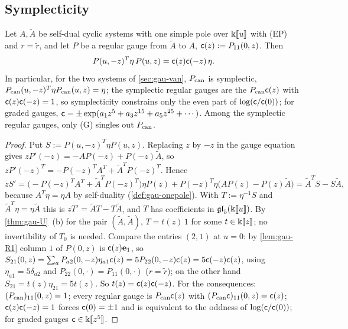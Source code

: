 \subsection{Symplecticity}
\label{sec:gau-symp}

\begin{prop}[Symplecticity]
\label{prop:gau-symp}
Let $A,\tilde A$ be self-dual cyclic systems with one simple pole over $\Bbbk[\![ u ]\!]$ with (EP) and $r=\tilde r$, and let $P$ be a regular gauge from $\tilde A$ to $A$, $\mathsf{c}(z):=P_{11}(0,z)$. Then
\begin{equation}
\label{eq:gau-symp}
P(u,-z)^T\eta\,P(u,z)=\mathsf{c}(z)\mathsf{c}(-z)\,\eta .
\end{equation}
In particular, for the two systems of \cref{sec:gau-van}, $P_{\mathrm{can}}$ is symplectic, $P_{\mathrm{can}}(u,-z)^T\eta P_{\mathrm{can}}(u,z)=\eta$; the symplectic regular gauges are the $P_{\mathrm{can}}\mathsf{c}(z)$ with $\mathsf{c}(z)\mathsf{c}(-z)=1$, so symplecticity constrains only the even part of $\log(\mathsf{c}/\mathsf{c}(0))$; for graded gauges, $\mathsf{c}=\pm\exp(a_1z^5+a_3z^{15}+a_5z^{25}+\cdots)$. Among the symplectic regular gauges, only (G) singles out $P_{\mathrm{can}}$.
\end{prop}

\begin{proof}
Put $S:=P(u,-z)^T\eta P(u,z)$. Replacing $z$ by $-z$ in the gauge equation gives $zP'(-z)=-AP(-z)+P(-z)\tilde A$, so $zP'(-z)^T=-P(-z)^TA^T+\tilde A^TP(-z)^T$. Hence
\[
zS'=\bigl(-P(-z)^TA^T+\tilde A^TP(-z)^T\bigr)\eta P(z)+P(-z)^T\eta\bigl(AP(z)-P(z)\tilde A\bigr)=\tilde A^TS-S\tilde A,
\]
because $A^T\eta=\eta A$ by self-duality (\cref{def:gau-onepole}). With $T:=\eta^{-1}S$ and $\tilde A^T\eta=\eta\tilde A$ this is $zT'=\tilde AT-T\tilde A$, and $T$ has coefficients in $\mathfrak{gl}_5(\Bbbk[\![ u ]\!])$. By \cref{thm:gau-U}~(b) for the pair $(\tilde A,\tilde A)$, $T=t(z)\,1$ for some $t\in\Bbbk[\![ z ]\!]$; no invertibility of $T_0$ is needed. Compare the entries $(2,1)$ at $u=0$: by \cref{lem:gau-R1} column $1$ of $P(0,z)$ is $\mathsf{c}(z)\mathbf e_1$, so $S_{21}(0,z)=\sum_aP_{a2}(0,-z)\eta_{a1}\mathsf{c}(z)=5P_{22}(0,-z)\mathsf{c}(z)=5\mathsf{c}(-z)\mathsf{c}(z)$, using $\eta_{a1}=5\delta_{a2}$ and $P_{22}(0,\cdot)=P_{11}(0,\cdot)$ ($r=\tilde r$); on the other hand $S_{21}=t(z)\eta_{21}=5t(z)$. So $t(z)=\mathsf{c}(z)\mathsf{c}(-z)$. For the consequences: $(P_{\mathrm{can}})_{11}(0,z)=1$; every regular gauge is $P_{\mathrm{can}}\mathsf{c}(z)$ with $(P_{\mathrm{can}}\mathsf{c})_{11}(0,z)=\mathsf{c}(z)$; $\mathsf{c}(z)\mathsf{c}(-z)=1$ forces $\mathsf{c}(0)=\pm1$ and is equivalent to the oddness of $\log(\mathsf{c}/\mathsf{c}(0))$; for graded gauges $\mathsf{c}\in\Bbbk[\![ z^5 ]\!]$.
\end{proof}

